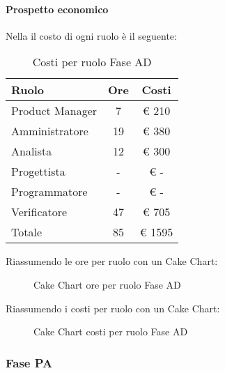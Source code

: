 			\paragraph{Prospetto economico}
				Nella  il costo di ogni ruolo è il seguente:
				\begin{table}
					\begin{center}
						\begin{tabular}{| l | c | c |}
							\hline
							Ruolo 				& Ore 		& Costi  \\ \hline
							
							Product Manager		& 7 		& \euro{} 210 	\\
							Amministratore 		& 19 		& \euro{} 380 	\\
							Analista	 		& 12 		& \euro{} 300 	\\
							Progettista 		& - 		& \euro{} -  	\\
							Programmatore		& - 		& \euro{} - 	\\
							Verificatore		& 47 		& \euro{} 705 	\\ \hline \hline
							
							Totale	 			& 85 		& \euro{} 1595 	\\ \hline
						\end{tabular}
					\end{center}
					\caption{Costi per ruolo Fase AD}
				\end{table}
				Riassumendo le ore per ruolo con un Cake Chart:
				\begin{figure}\centering
					\caption{Cake Chart ore per ruolo Fase AD}
				\end{figure}
				Riassumendo i costi per ruolo con un Cake Chart:
				\begin{figure}\centering
					\caption{Cake Chart costi per ruolo Fase AD}
				\end{figure}
		\subsubsection{Fase PA}
